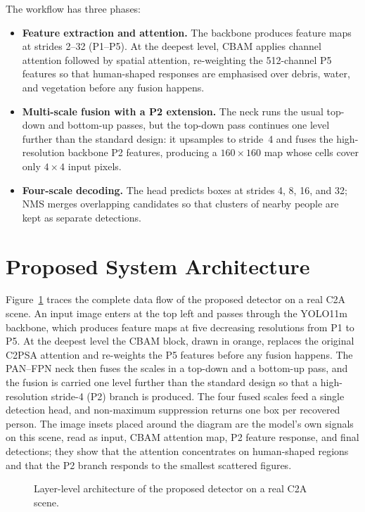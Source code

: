 The workflow has three phases:
\begin{itemize}
  \item \textbf{Feature extraction and attention.} The backbone produces feature
  maps at strides 2--32 (P1--P5). At the deepest level, CBAM applies channel
  attention followed by spatial attention, re-weighting the 512-channel P5
  features so that human-shaped responses are emphasised over debris, water, and
  vegetation before any fusion happens.
  \item \textbf{Multi-scale fusion with a P2 extension.} The neck runs the usual
  top-down and bottom-up passes, but the top-down pass continues one level
  further than the standard design: it upsamples to stride~4 and fuses the
  high-resolution backbone P2 features, producing a $160 \times 160$ map whose
  cells cover only $4 \times 4$ input pixels.
  \item \textbf{Four-scale decoding.} The head predicts boxes at strides 4, 8,
  16, and 32; NMS merges overlapping candidates so that clusters of nearby
  people are kept as separate detections.
\end{itemize}

\section{Proposed System Architecture}
Figure~\ref{fig:fullarch} traces the complete data flow of the proposed
detector on a real C2A scene. An input image enters at the top left and passes
through the YOLO11m backbone, which produces feature maps at five decreasing
resolutions from P1 to P5. At the deepest level the CBAM block, drawn in
orange, replaces the original C2PSA attention and re-weights the P5 features
before any fusion happens. The PAN--FPN neck then fuses the scales in a
top-down and a bottom-up pass, and the fusion is carried one level further than
the standard design so that a high-resolution stride-4 (P2) branch is produced.
The four fused scales feed a single detection head, and non-maximum suppression
returns one box per recovered person. The image insets placed around the
diagram are the model's own signals on this scene, read as input, CBAM
attention map, P2 feature response, and final detections; they show that the
attention concentrates on human-shaped regions and that the P2 branch responds
to the smallest scattered figures.

\begin{figure}[H]
  \centering
  \caption{Layer-level architecture of the proposed detector on a real C2A scene.}
  \label{fig:fullarch}
\end{figure}

